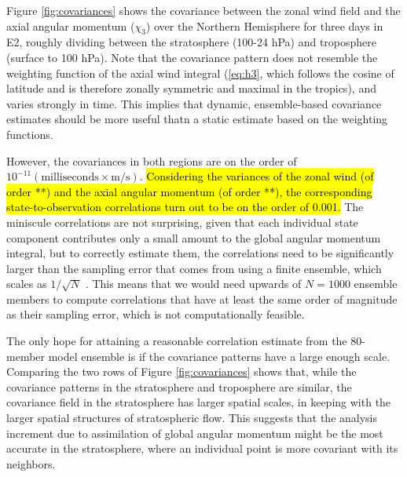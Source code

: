 Figure \ref{fig:covariances} shows the covariance between the zonal wind field and the axial angular momentum ($\chi_3$) over the Northern Hemisphere for three days in E2, roughly dividing between the 
stratosphere (100-24 hPa) 
and
troposphere (surface to 100 hPa).
Note that the covariance pattern does not resemble the weighting function of the axial wind integral (\ref{eq:h3}, which follows the cosine of latitude and is therefore zonally symmetric and maximal in the tropics), and varies strongly in time. 
This implies that dynamic, ensemble-based covariance estimates should be more useful thatn a static estimate based on the weighting functions.

However, the covariances in both regions are on the order of $10^{-11}(\text{milliseconds} \times \text{m/s})$.  
\hl{Considering the variances of the zonal wind (of order **) and the axial angular momentum (of order **), the corresponding state-to-observation correlations turn out to be on the order of 0.001.} 
The miniscule correlations are not surprising, given that each individual state component contributes only a small amount to the global angular momentum integral, but to 
correctly estimate them, the correlations need to be significantly larger than the sampling error that comes from using a finite ensemble, which 
scales as $1/\sqrt{N}$ \citep{Houtekamer1998}. 
This means that we would need upwards of $N=1000$ ensemble members to compute correlations that have at least the same order of magnitude as their sampling error, which is not computationally feasible. 

The only hope for attaining a reasonable correlation estimate from the 80-member model ensemble is if the covariance patterns have a large enough scale.  
Comparing the two rows of Figure \ref{fig:covariances} shows that, while
the covariance patterns in the stratosphere and troposphere are similar, the covariance field in the stratosphere has larger spatial scales, in keeping with the larger spatial structures of stratospheric flow.
This suggests that the analysis increment due to assimilation of global angular momentum might be the most accurate in the stratosphere, where an individual point is more covariant with its neighbors.  

